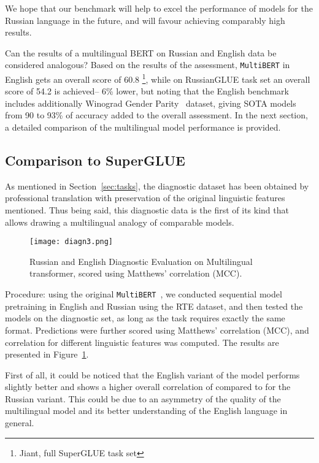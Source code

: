 \documentclass[11pt,a4paper]{article}
\begin{document}
We hope that our benchmark will help to excel the performance of models for the Russian language in the future, and will favour achieving comparably high results.

Can the results of a multilingual BERT on Russian and English data be considered analogous? Based on the results of the assessment, \texttt{MultiBERT} in English gets an overall score of 60.8 \footnote{Jiant, full SuperGLUE task set}, while on RussianGLUE task set an overall score of 54.2 is achieved-- 6\% lower, but noting that the English benchmark includes additionally Winograd Gender Parity~\cite{levesque2012winograd} dataset, giving SOTA models from 90 to 93\% of accuracy added to the overall assessment.  In the next section, a detailed comparison of the multilingual model performance is provided.


\subsection{Comparison to SuperGLUE}
As mentioned in Section~\ref{sec:tasks}, the diagnostic dataset has been obtained by professional translation with preservation of the original linguistic features mentioned.
Thus being said, this diagnostic data is the first of its kind that allows drawing a multilingual analogy of comparable models.

\begin{figure}[!htbp]
\centering
\texttt{[image: diagn3.png]}
\caption{Russian and English Diagnostic Evaluation on Multilingual transformer, scored using
Matthews’ correlation (MCC).}
\label{fig:diag-res}
\end{figure}

Procedure: using the original \texttt{MultiBERT}~\cite{devlin2019bert}, we conducted sequential model pretraining in English and Russian using the RTE dataset, and then tested the models on the diagnostic set, as long as the task requires exactly the same format. Predictions were further scored using Matthews’ correlation (MCC), and correlation for different linguistic features was computed. The results are presented in Figure~\ref{fig:diag-res}.

First of all, it could be noticed that the English variant of the model performs slightly better and shows a higher overall correlation of  compared to  for the Russian variant. This could be due to an asymmetry of the quality of the multilingual model and its better understanding of the English language in general.
\end{document}
